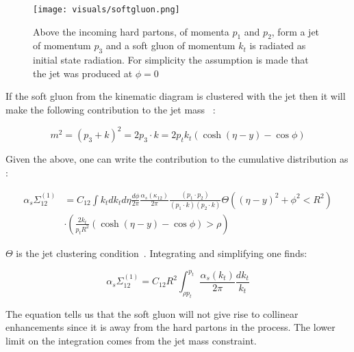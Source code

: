 \begin{figure}[htb]
\centering
\texttt{[image: visuals/softgluon.png]}
\caption{Above the incoming hard partons, of momenta $p_1$ and $p_2$, form a jet of momentum $p_3$ and a soft gluon of momentum $k_t$ is radiated as initial state radiation. For simplicity the assumption is made that the jet was produced at $\phi = 0$  }
\label{softgluon}
\end{figure}


If the soft gluon from the kinematic diagram is clustered with the jet then it will make the following contribution to the jet mass ~\cite{Marzani:2019hun}:\newline


\begin{equation}
m^{2}=\left(p_{3}+k\right)^{2}=2 p_{3} \cdot k=2 p_{t} k_{t}(\cosh (\eta-y)-\cos \phi)
\end{equation}

Given the above, one can write the contribution to the cumulative distribution as :\newline

\begin{equation}
\begin{aligned} \alpha_{s} \Sigma_{12}^{(1)} &=C_{12} \int k_{t} d k_{t} d \eta \frac{d \phi}{2 \pi} \frac{\alpha_{s}\left(\kappa_{12}\right)}{2 \pi} \frac{\left(p_{1} \cdot p_{2}\right)}{\left(p_{1} \cdot k\right)\left(p_{2} \cdot k\right)} \Theta\left((\eta-y)^{2}+\phi^{2}<R^{2}\right) \\ & \cdot\left(\frac{2 k_{t}}{p_{t} R^{2}}(\cosh (\eta-y)-\cos \phi)>\rho\right) \end{aligned}
\end{equation}

$\Theta$ is the jet clustering condition~\cite{Marzani:2019hun}. Integrating and simplifying one finds:\newline

\begin{equation}
\alpha_{s} \Sigma_{12}^{(1)}=C_{12} R^{2} \int_{\rho p_{t}}^{p_{t}} \frac{\alpha_{s}\left(k_{t}\right)}{2 \pi} \frac{d k_{t}}{k_{t}}
\end{equation}

The equation tells us that the soft gluon will not give rise to collinear enhancements since it is away from the hard partons in the process. The lower limit on the integration comes from the jet mass constraint.




